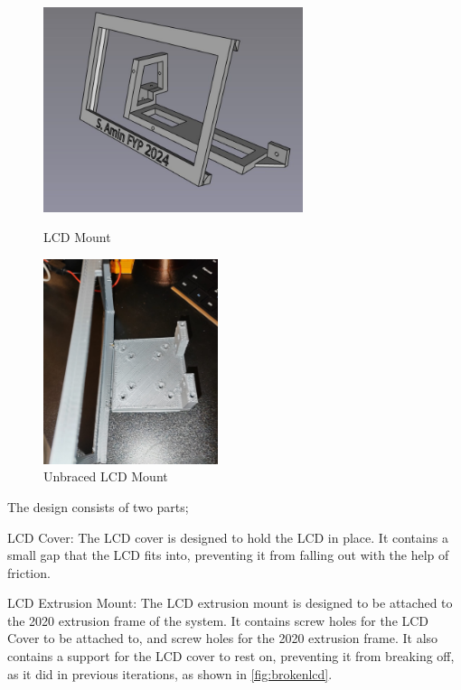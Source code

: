 \begin{figure}[ht]
    \centering
    \begin{minipage}{0.45\textwidth}
        \centering
        \includegraphics[height=6cm]{imgs/freecad/lcd_mount2.jpg}
        \caption{LCD Mount}
    \end{minipage}\hfill
    \begin{minipage}{0.45\textwidth}
        \centering
        \includegraphics[height=6cm]{imgs/design/unbracedscreen.jpeg}
        \caption{Unbraced LCD Mount}
        \label{fig:brokenlcd}
    \end{minipage}
\end{figure}

The design consists of two parts;
\begin{mylist}
    \item LCD Cover: The LCD cover is designed to hold the LCD in place. It contains a small gap that the LCD fits into, preventing it from falling out with the help of friction.
    \item LCD Extrusion Mount: The LCD extrusion mount is designed to be attached to the 2020 extrusion frame of the system. It contains screw holes for the LCD Cover to be attached to, and screw holes for the 2020 extrusion frame. It also contains a support for the LCD cover to rest on, preventing it from breaking off, as it did in previous iterations, as shown in \autoref{fig:brokenlcd}.
\end{mylist}

